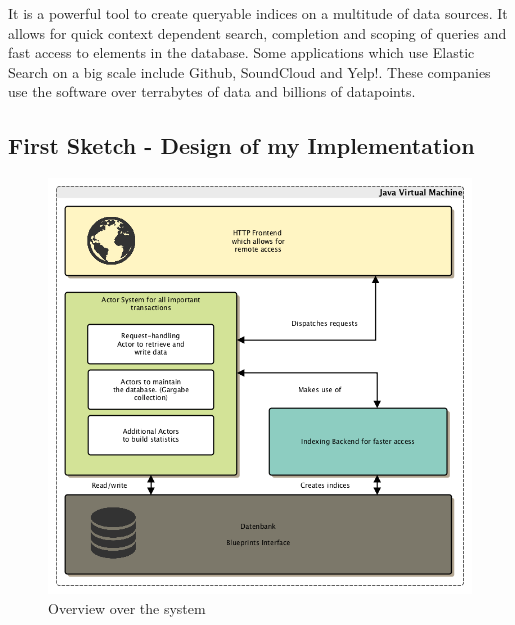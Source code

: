 \documentclass[11p]{scrartcl}
\begin{document}
It is a powerful tool to create queryable indices on a multitude of data sources. It allows for quick context dependent search, completion and scoping of queries and fast access to elements in the database.
Some applications which use Elastic Search on a big scale include Github, SoundCloud and Yelp!. These companies use the software over terrabytes of data and billions of datapoints. \cite{link:esUses}
	
\subsection{First Sketch - Design of my Implementation}
\label{sec:firstSketch}

\begin{figure}[h!]		
 	\includegraphics[scale=0.5]{figures/roughOverview.png}
	\caption{Overview over the system}
	\label{fig:roughOverview}
\end{figure}
\end{document}
